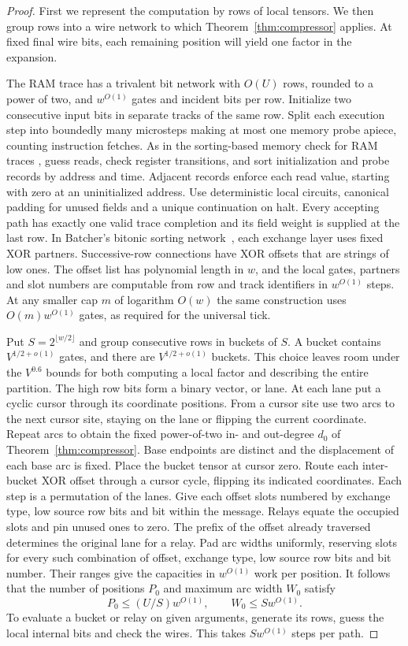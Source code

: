 \begin{proof}
First we represent the computation by rows of local tensors. We then
group rows into a wire network to which Theorem~\ref{thm:compressor}
applies. At fixed final wire bits, each remaining position will yield
one factor in the expansion.

The RAM trace has a trivalent bit network with $O(U)$ rows, rounded
to a power of two, and $w^{O(1)}$ gates and incident bits per row.
Initialize two consecutive input bits in separate tracks of the same
row. Split each execution step into boundedly many microsteps making at
most one memory probe apiece, counting instruction fetches. As in the
sorting-based memory check for RAM traces \cite{TinyRAM}, guess reads,
check register transitions, and sort initialization and probe records
by address and time. Adjacent records enforce each read value, starting
with zero at an uninitialized address. Use deterministic local circuits,
canonical padding for unused fields and a unique continuation on halt.
Every accepting path has exactly one valid trace completion and its field
weight is supplied at the last row. In Batcher's bitonic sorting
network~\cite{Batcher}, each exchange layer uses fixed XOR partners.
Successive-row connections have XOR offsets that are strings of low
ones. The offset list has polynomial length in $w$, and the local gates,
partners and slot numbers are computable from row and track identifiers
in $w^{O(1)}$ steps. At any smaller cap $m$ of logarithm $O(w)$ the same construction
uses $O(m)w^{O(1)}$ gates, as required for the universal tick.

Put $S=2^{\lfloor w/2\rfloor}$ and group consecutive rows in buckets
of $S$. A bucket contains $V^{1/2+o(1)}$ gates, and there are
$V^{1/2+o(1)}$ buckets. This choice leaves room under the $V^{0.6}$
bounds for both computing a local factor and describing the entire
partition. The high row bits form a binary vector, or lane. At each lane put a
cyclic cursor through its coordinate positions. From a cursor site use
two arcs to the next cursor site, staying on the lane or flipping the
current coordinate. Repeat arcs to obtain the fixed power-of-two in-
and out-degree $d_0$ of Theorem~\ref{thm:compressor}. Base endpoints are
distinct and the displacement of each base arc is fixed. Place the bucket
tensor at cursor zero. Route each inter-bucket XOR offset through a
cursor cycle, flipping its indicated coordinates. Each step is a
permutation of the lanes. Give each offset slots numbered by exchange
type, low source row bits and bit within the message. Relays equate
the occupied slots and pin unused ones to zero. The prefix of the
offset already traversed determines the original lane for a relay.
Pad arc widths uniformly, reserving slots for every such combination of
offset, exchange type, low source row bits and bit number. Their ranges
give the capacities in $w^{O(1)}$ work per position.
It follows that the number of positions $P_0$ and maximum arc width $W_0$
satisfy
\[
         P_0\le (U/S)w^{O(1)},\qquad W_0\le Sw^{O(1)}.
\]
To evaluate a bucket or relay on given arguments, generate its rows,
guess the local internal bits and check the wires. This takes
$Sw^{O(1)}$ steps per path.


\end{proof}
